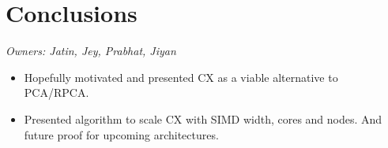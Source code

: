 \section{Conclusions}
\textit{Owners: Jatin, Jey, Prabhat, Jiyan}
\begin{itemize}
  \item Hopefully motivated and presented CX as a viable alternative to PCA/RPCA. 
  \item Presented algorithm to scale CX with SIMD width, cores and nodes. And future proof for upcoming architectures.
\end{itemize}
